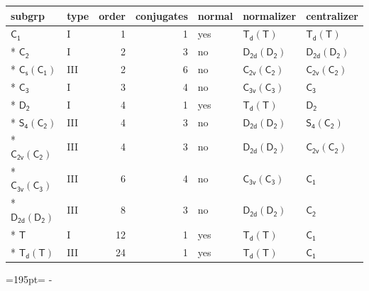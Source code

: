 \documentclass[10pt,a4paper]{article}
\newcommand{\needspace}[1]{\par\penalty-100\begingroup\dimen0=#1\relax\dimen2=\pagegoal
  \advance\dimen2-\pagetotal\ifdim\dimen0>\dimen2\relax\ifdim\dimen2>0pt\vfil\break\fi\fi
  \endgroup}
\numberwithin{equation}{section}
\newcommand{\grp}[1]{\mathsf{#1}}
\begin{document}
{\small\begin{longtable}{@{}llrrlll@{}}\toprule
subgrp & type & order & conjugates & normal & normalizer & centralizer\\\midrule\endhead
\bottomrule\endfoot\endlastfoot
\href{../../../rotation/data/pdf/C1.pdf}{$\grp{C_{1}}$} & I & 1 & 1 & yes & \href{Td-T.pdf}{$\grp{T_{d}}(\grp{T})$} & \href{Td-T.pdf}{$\grp{T_{d}}(\grp{T})$}\\*
\href{../../../rotation/data/pdf/C2.pdf}{$\grp{C_{2}}$} & I & 2 & 3 & no & \href{D2d-D2.pdf}{$\grp{D_{2d}}(\grp{D_{2}})$} & \href{D2d-D2.pdf}{$\grp{D_{2d}}(\grp{D_{2}})$}\\*
\href{C1v-C1.pdf}{$\grp{C_{s}}(\grp{C_{1}})$} & III & 2 & 6 & no & \href{C2v-C2.pdf}{$\grp{C_{2v}}(\grp{C_{2}})$} & \href{C2v-C2.pdf}{$\grp{C_{2v}}(\grp{C_{2}})$}\\*
\href{../../../rotation/data/pdf/C3.pdf}{$\grp{C_{3}}$} & I & 3 & 4 & no & \href{C3v-C3.pdf}{$\grp{C_{3v}}(\grp{C_{3}})$} & \href{../../../rotation/data/pdf/C3.pdf}{$\grp{C_{3}}$}\\*
\href{../../../rotation/data/pdf/D2.pdf}{$\grp{D_{2}}$} & I & 4 & 1 & yes & \href{Td-T.pdf}{$\grp{T_{d}}(\grp{T})$} & \href{../../../rotation/data/pdf/D2.pdf}{$\grp{D_{2}}$}\\*
\href{S4-C2.pdf}{$\grp{S_{4}}(\grp{C_{2}})$} & III & 4 & 3 & no & \href{D2d-D2.pdf}{$\grp{D_{2d}}(\grp{D_{2}})$} & \href{S4-C2.pdf}{$\grp{S_{4}}(\grp{C_{2}})$}\\*
\href{C2v-C2.pdf}{$\grp{C_{2v}}(\grp{C_{2}})$} & III & 4 & 3 & no & \href{D2d-D2.pdf}{$\grp{D_{2d}}(\grp{D_{2}})$} & \href{C2v-C2.pdf}{$\grp{C_{2v}}(\grp{C_{2}})$}\\*
\href{C3v-C3.pdf}{$\grp{C_{3v}}(\grp{C_{3}})$} & III & 6 & 4 & no & \href{C3v-C3.pdf}{$\grp{C_{3v}}(\grp{C_{3}})$} & \href{../../../rotation/data/pdf/C1.pdf}{$\grp{C_{1}}$}\\*
\href{D2d-D2.pdf}{$\grp{D_{2d}}(\grp{D_{2}})$} & III & 8 & 3 & no & \href{D2d-D2.pdf}{$\grp{D_{2d}}(\grp{D_{2}})$} & \href{../../../rotation/data/pdf/C2.pdf}{$\grp{C_{2}}$}\\*
\href{../../../rotation/data/pdf/T.pdf}{$\grp{T}$} & I & 12 & 1 & yes & \href{Td-T.pdf}{$\grp{T_{d}}(\grp{T})$} & \href{../../../rotation/data/pdf/C1.pdf}{$\grp{C_{1}}$}\\*
\href{Td-T.pdf}{$\grp{T_{d}}(\grp{T})$} & III & 24 & 1 & yes & \href{Td-T.pdf}{$\grp{T_{d}}(\grp{T})$} & \href{../../../rotation/data/pdf/C1.pdf}{$\grp{C_{1}}$}\\
\bottomrule\end{longtable}}
\needspace{195pt}
\end{document}
